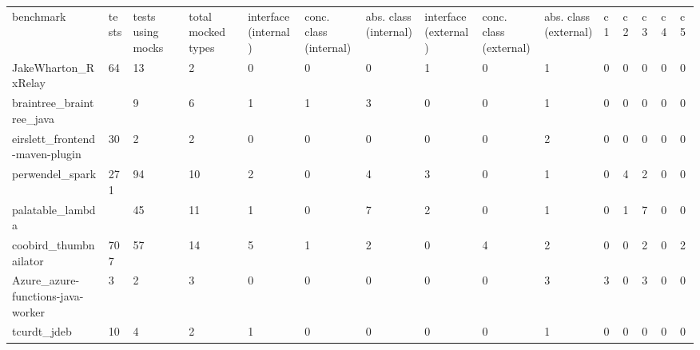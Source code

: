 \begin{table}[]
    \begin{tabular}{lllllllllllllll}
        benchmark                            & tests & tests using mocks & total mocked types & interface (internal) & conc. class (internal) & abs. class (internal) & interface (external) & conc. class (external) & abs. class (external) & c1 & c2 & c3 & c4 & c5 \\
        JakeWharton\_RxRelay                 & 64    & 13                & 2                  & 0                    & 0                      & 0                     & 1                    & 0                      & 1                     & 0  & 0  & 0  & 0  & 0  \\
        braintree\_braintree\_java           &      & 9                 & 6                  & 1                    & 1                      & 3                     & 0                    & 0                      & 1                     & 0  & 0  & 0  & 0  & 0  \\
        eirslett\_frontend-maven-plugin      & 30    & 2                 & 2                  & 0                    & 0                      & 0                     & 0                    & 0                      & 2                     & 0  & 0  & 0  & 0  & 0  \\
        perwendel\_spark                     & 271   & 94                & 10                 & 2                    & 0                      & 4                     & 3                    & 0                      & 1                     & 0  & 4  & 2  & 0  & 0  \\
        palatable\_lambda                    &      & 45                & 11                 & 1                    & 0                      & 7                     & 2                    & 0                      & 1                     & 0  & 1  & 7  & 0  & 0  \\
        coobird\_thumbnailator               & 707   & 57                & 14                 & 5                    & 1                      & 2                     & 0                    & 4                      & 2                     & 0  & 0  & 2  & 0  & 2  \\
        Azure\_azure-functions-java-worker   & 3     & 2                 & 3                  & 0                    & 0                      & 0                     & 0                    & 0                      & 3                     & 3  & 0  & 3  & 0  & 0  \\
        tcurdt\_jdeb                         & 10    & 4                 & 2                  & 1                    & 0                      & 0                     & 0                    & 0                      & 1                     & 0  & 0  & 0  & 0  & 0  \\

\end{tabular}
\end{table}
